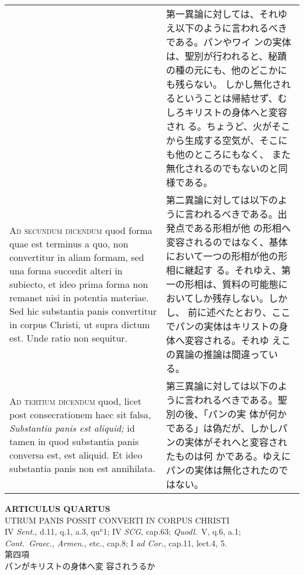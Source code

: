 \documentclass[10pt]{jsarticle} %
\begin{document}
\begin{longtable}{p{21em}p{21em}}
&

第一異論に対しては、それゆえ以下のように言われるべきである。パンやワイ
ンの実体は、聖別が行われると、秘蹟の種の元にも、他のどこかにも残らない。
しかし無化されるということは帰結せず、むしろキリストの身体へと変容され
る。ちょうど、火がそこから生成する空気が、そこにも他のところにもなく、
また無化されるのでもないのと同様である。


\\



{\scshape Ad secundum dicendum} quod forma quae est terminus a quo,
non convertitur in aliam formam, sed una forma succedit alteri in
subiecto, et ideo prima forma non remanet nisi in potentia
materiae. Sed hic substantia panis convertitur in corpus Christi, ut
supra dictum est. Unde ratio non sequitur.

&

第二異論に対しては以下のように言われるべきである。出発点である形相が他
の形相へ変容されるのではなく、基体において一つの形相が他の形相に継起す
る。それゆえ、第一の形相は、質料の可能態においてしか残存しない。しかし、
前に述べたとおり、ここでパンの実体はキリストの身体へ変容される。それゆ
えこの異論の推論は間違っている。


\\



{\scshape Ad tertium dicendum} quod, licet post consecrationem haec
sit falsa, {\itshape Substantia panis est aliquid;} id tamen in quod
substantia panis conversa est, est aliquid. Et ideo substantia panis
non est annihilata.

&

第三異論に対しては以下のように言われるべきである。聖別の後、「パンの実
体が何かである」は偽だが、しかしパンの実体がそれへと変容されたものは何
かである。ゆえにパンの実体は無化されたのではない。


\end{longtable}
\newpage


\begin{center}
{\Large {\bf ARTICULUS QUARTUS}}\\ {\large UTRUM PANIS POSSIT CONVERTI
IN CORPUS CHRISTI}\\ {\footnotesize IV {\itshape Sent.}, d.11, q.1,
a.3, qu$^a$1; IV {\itshape SCG}, cap.63; {\itshape Quodl}.~V, q.6,
a.1;\\ {\itshape Cont.~Graec., Armen.,} etc., cap.8; I {\itshape ad
Cor.}, cap.11, lect.4, 5.}\\ {\Large 第四項\\パンがキリストの身体へ変
容されうるか}
\end{center}
\end{document}
